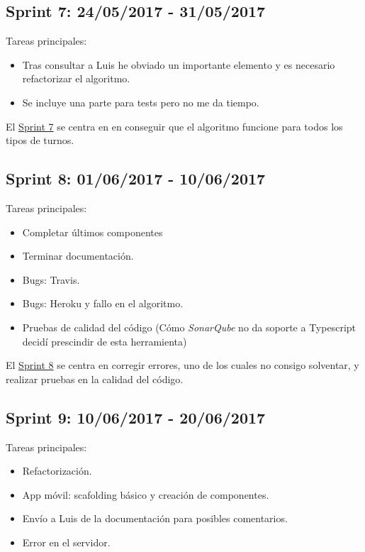 \subsection{Sprint 7: 24/05/2017 - 31/05/2017}\label{sprint7}

Tareas principales:

\begin{itemize}

		\item Tras consultar a Luis he obviado un importante elemento y es necesario refactorizar el algoritmo.
	\item Se incluye una parte para tests pero no me da tiempo.
\end{itemize}


El \underline{Sprint 7} se centra en en conseguir que el algoritmo funcione para todos los tipos de turnos.

\subsection{Sprint 8: 01/06/2017 - 10/06/2017}\label{sprint8}

Tareas principales:

\begin{itemize}
	\item Completar últimos componentes
	\item Terminar documentación.
	\item Bugs: Travis. 
	\item Bugs: Heroku y fallo en el algoritmo.
	\item Pruebas de calidad del código (Cómo \emph{SonarQube} no da soporte a Typescript decidí prescindir de esta herramienta)
\end{itemize}


El \underline{Sprint 8} se centra en corregir errores, uno de los cuales no consigo solventar, y realizar pruebas en la calidad del código. 

\subsection{Sprint 9: 10/06/2017 - 20/06/2017}\label{sprint9}

Tareas principales:

\begin{itemize}
	\item Refactorización.
	\item App móvil: scafolding básico y creación de componentes.
	\item Envío a Luis de la documentación para posibles comentarios.
	\item Error en el servidor.
	
\end{itemize}

